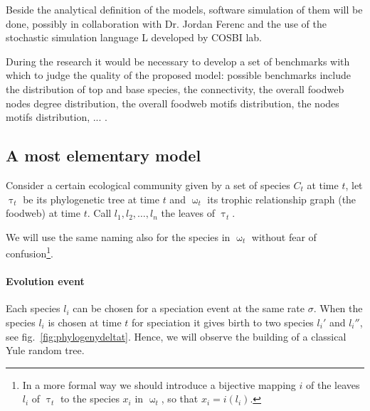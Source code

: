 \documentclass[12pt,a4paper]{report}
\begin{document}
Beside the analytical definition of the models, software simulation of them will be done, possibly in collaboration with Dr. Jordan Ferenc and the use of the stochastic simulation language L developed by COSBI lab.

During the research it would be necessary to develop a set of benchmarks with which to judge the quality of the proposed model: possible benchmarks include the distribution of top and base species, the connectivity, the overall foodweb nodes degree distribution, the overall foodweb motifs distribution, the nodes motifs distribution, ... .

\subsection{A most elementary model}\label{elementary_model}

Consider a certain ecological community given by a set of species $C_t$ at time $t$, let $\uptau_t$ be its phylogenetic tree at time $t$ and $\upomega_t$ its trophic relationship graph (the foodweb) at time $t$. Call $l_1, l_2, \dots , l_n$ the leaves of $\uptau_t$.

We will use the same naming also for the species in $\upomega_t$ without fear of confusion\footnote{In a more formal way we should introduce a bijective mapping $i$ of the leaves $l_i$ of $\uptau_t$ to the species $x_i$ in $\upomega_t$, so that $x_i=i(l_i)$.}.

\paragraph{Evolution event}

Each species $l_i$ can be chosen for a speciation event at the same rate $\sigma$. When the species $l_i$ is chosen at time $t$ for speciation it gives birth to two species $l_i'$ and $l_i''$, see fig.~\ref{fig:phylogenydeltat}. Hence, we will observe the building of a classical Yule random tree.
\end{document}
